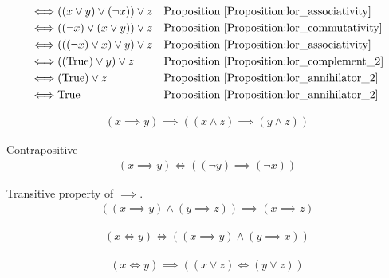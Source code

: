 \begin{prop}
\begin{align*}
\iff & ((x \lor y) \lor (\lnot x)) \lor z
&& \text{Proposition \ref{Proposition:lor_associativity}} \\
\iff & ((\lnot x) \lor (x \lor y)) \lor z
&& \text{Proposition \ref{Proposition:lor_commutativity}} \\
\iff & (((\lnot x) \lor x) \lor y) \lor z
&& \text{Proposition \ref{Proposition:lor_associativity}} \\
\iff & ((\text{True}) \lor y) \lor z
&& \text{Proposition \ref{Proposition:lor_complement_2}} \\
\iff & (\text{True}) \lor z
&& \text{Proposition \ref{Proposition:lor_annihilator_2}} \\
\iff & \text{True}
&& \text{Proposition \ref{Proposition:lor_annihilator_2}} \\
\end{align*}
\end{prop}

\begin{prop}
\label{Proposition:implies_land}
\begin{align*}
(x \implies y) \implies ((x \land z) \implies (y \land z))
\end{align*}
\end{prop}

\begin{prop}
\label{Proposition:contrapositive}
Contrapositive
\begin{align*}
(x \implies y) \iff ((\lnot y) \implies (\lnot x))
\end{align*}
\end{prop}

\begin{prop}
\label{Proposition:implies_transitive}
Transitive property of $\implies$.
\begin{align*}
((x \implies y) \land (y \implies z)) \implies (x \implies z)
\end{align*}
\end{prop}

\begin{prop}
\begin{align*}
(x \iff y) \iff ((x \implies y) \land (y \implies x))
\end{align*}
\end{prop}

\begin{prop}
\label{Proposition:iff_lor}
\begin{align*}
(x \iff y) \implies ((x \lor z) \iff (y \lor z))
\end{align*}
\end{prop}

